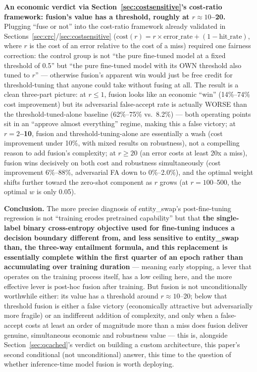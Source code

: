 \documentclass[11pt]{article}
\begin{document}
\textbf{An economic verdict via Section~\ref{sec:costsensitive}'s cost-ratio framework: fusion's value has a threshold, roughly at $r \approx 10$--20.} Plugging ``fuse or not'' into the cost-ratio framework already validated in Sections~\ref{sec:crc}/\ref{sec:costsensitive} ($\mathrm{cost}(r) = r \times \mathrm{error\_rate} + (1 - \mathrm{hit\_rate})$, where $r$ is the cost of an error relative to the cost of a miss) required one fairness correction: the control group is not ``the pure fine-tuned model at a fixed threshold of 0.5'' but ``the pure fine-tuned model with its OWN threshold also tuned to $r$'' --- otherwise fusion's apparent win would just be free credit for threshold-tuning that anyone could take without fusing at all. The result is a clean three-part picture: at \textbf{$r \le 1$}, fusion looks like an economic ``win'' (14\%--74\% cost improvement) but its adversarial false-accept rate is actually WORSE than the threshold-tuned-alone baseline (62\%--75\% vs.\ 8.2\%) --- both operating points sit in an ``approve almost everything'' regime, making this a false victory; at \textbf{$r = 2$--10}, fusion and threshold-tuning-alone are essentially a wash (cost improvement under 10\%, with mixed results on robustness), not a compelling reason to add fusion's complexity; at \textbf{$r \ge 20$} (an error costs at least 20x a miss), fusion wins decisively on both cost and robustness simultaneously (cost improvement 6\%--88\%, adversarial FA down to 0\%--2.0\%), and the optimal weight shifts further toward the zero-shot component as $r$ grows (at $r=100$--500, the optimal $w$ is only 0.05).

\textbf{Conclusion.} The more precise diagnosis of entity\_swap's post-fine-tuning regression is not ``training erodes pretrained capability'' but that \textbf{the single-label binary cross-entropy objective used for fine-tuning induces a decision boundary different from, and less sensitive to entity\_swap than, the three-way entailment formula, and this replacement is essentially complete within the first quarter of an epoch rather than accumulating over training duration} --- meaning early stopping, a lever that operates on the training process itself, has a low ceiling here, and the more effective lever is post-hoc fusion after training. But fusion is not unconditionally worthwhile either: its value has a threshold around $r \approx 10$--20; below that threshold fusion is either a false victory (economically attractive but adversarially more fragile) or an indifferent addition of complexity, and only when a false-accept costs at least an order of magnitude more than a miss does fusion deliver genuine, simultaneous economic and robustness value --- this is, alongside Section~\ref{sec:qcached}'s verdict on building a custom architecture, this paper's second conditional (not unconditional) answer, this time to the question of whether inference-time model fusion is worth deploying.
\end{document}
